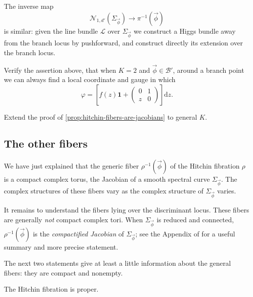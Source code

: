 \documentclass[12pt,letterpaper,reqno]{article}
\numberwithin{equation}{section}
\newcommand{\cB}{\ensuremath{\mathcal B}}
\newcommand{\cL}{\ensuremath{\mathcal L}}
\newcommand{\cN}{\ensuremath{\mathcal N}}
\newcommand\bid{{\mathbf 1}}
\newcommand{\de}{\mathrm{d}}
\newcommand{\ti}[1]{\textit{#1}}
\begin{document}
\begin{pf}
The inverse map
\begin{equation}
\cN_{1,d'}(\Sigma_{\vec\phi}) \to \pi^{-1}(\vec\phi)
\end{equation}
is similar: given the line bundle $\cL$
over $\Sigma_{\vec\phi}$ we construct a Higgs bundle
away from the branch locus by pushforward, and construct
directly its extension over the branch locus.
\end{pf}

\begin{exercise} Verify the assertion above, that when $K=2$
and $\vec\phi \in \cB'$, around a branch point we can
always find a local coordinate and gauge in which
\begin{equation}
 \varphi = \left[f(z) \bid + \begin{pmatrix} 0 & 1 \\ z & 0 \end{pmatrix}\right] \de z.
\end{equation}
\end{exercise}

\begin{exercise} Extend the proof of \autoref{prop:hitchin-fibers-are-jacobians} to general $K$.
\end{exercise}


\subsection{The other fibers}

We have just explained that the generic fiber $\rho^{-1}(\vec\phi)$
of the Hitchin fibration $\rho$ is a compact complex torus,
the Jacobian of a smooth spectral curve $\Sigma_{\vec\phi}$.
The complex structures of these fibers
vary as the complex structure of $\Sigma_{\vec\phi}$ varies.

It remains to
understand the fibers lying over the discriminant locus.
These fibers are generally \ti{not} compact complex tori.
When $\Sigma_{\vec\phi}$ is reduced and connected,
$\rho^{-1}(\vec\phi)$ is the
\ti{compactified Jacobian} of $\Sigma_{\vec\phi}$;
see the Appendix of \cite{Melo2012} for a useful summary and
more precise statement.

The next two statements give at least a little information about
the general fibers: they are compact and nonempty.

\begin{prop} The Hitchin fibration
is proper.
\end{prop}
\end{document}
